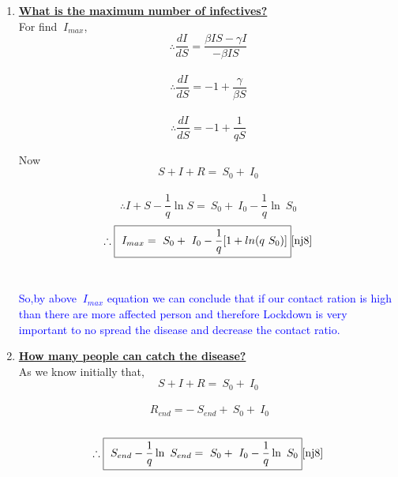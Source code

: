 \documentclass[12pt]{article}
\begin{document}
{\begin{enumerate}
\item{\bf\underline{What is the maximum number of infectives?}\cite{nj8}}
\\
For find $\ I_{max}$,\\
[1 cm]
$$\therefore \frac{dI}{dS}=\frac{\beta IS-\gamma I}{-\beta IS}$$\\
[0.5 mm]
$$\therefore \frac{dI}{dS}=-1+\frac{\gamma}{\beta S}$$
\\[0.5 mm]
\begin{equation}
\therefore \boxed{\frac{dI}{dS}=-1+\frac{1}{qS}}
\end{equation}
\par Now $$S+I+R=\ S_{0}+\ I_{0}$$
\\
[0.5 mm]
\begin{equation}
\therefore I+S-\frac{1}{q}\ln{S}=\ S_{0}+\ I_{0}-\frac{1}{q}\ln{\ S_{0}}
\end{equation}
\begin{equation}
\therefore \boxed{\ I_{max}=\ S_{0}+\ I_{0}-\frac{1}{q}[1+ln({q\ S_{0}})]}\cite{nj8}
\end{equation}
\\

\begin{tcolorbox}[enhanced,fit to height=4cm,
  colback=yellow!25!black!10!yellow,colframe=green!75!white,title=\textcolor{red}{Conclusion:2},
  drop fuzzy shadow]
  \textcolor{blue}{So,by above $\ I_{max}$ equation we can conclude that if our contact ration is high than there are more affected person and therefore \textcolor{blue}{Lockdown is very important to no spread the disease and decrease the contact ratio.}} 
\end{tcolorbox}





\item{\bf\underline{How many people can catch the disease?}}\cite{nj8}
\\
[1 cm]
As we know initially that,
$$S+I+R=\ S_{0}+\ I_{0} $$ \\
\begin{equation}
\ R_{end}=-\ S_{end}+\ S_{0}+\ I_{0}
\end{equation}\\
[0.5 mm]
\begin{equation}
\therefore \boxed{\ S_{end}-\frac{1}{q}\ln{\ S_{end}}=\ S_{0}+\ I_{0}-\frac{1}{q}\ln{\ S_{0}}}\cite{nj8}
\end{equation}
\\



\end{enumerate}}
\end{document}
